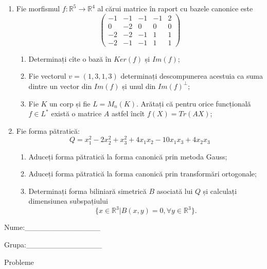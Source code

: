 \documentclass{article}
\begin{document}
\begin{enumerate}
 \item Fie morfismul $f:\mathbb{R}^5 \to \mathbb{R}^4$ al cărui matrice în raport cu bazele canonice este
$$\begin{pmatrix}
-1&-1&-1&-1&2\\
0&-2&0&0&0\\
-2&-2&-1&1&1\\
-2&-1&-1&1&1
\end{pmatrix}$$

\begin{enumerate}
\item Determinați cîte o bază în $Ker(f)$ și $Im(f)$;
\item Fie vectorul $v=(1,3,1,3)$ determinați descompunerea acestuia ca suma dintre un vector din $Im(f)$ și unul din $Im(f)^\perp$;
\item Fie $K$ un corp și fie $L=M_n(K)$. Arătați că pentru orice funcțională $f \in L^*$ există o matrice $A$ astfel încît $f(X)=Tr(AX)$;
\end{enumerate}
\item Fie forma pătratică:
$$Q= x_1^2-2x_2^2+x_3^2+4x_1x_2-10x_1x_3+4x_2x_3$$

\begin{enumerate}
\item Aduceți forma pătratică la forma canonică prin metoda Gauss;
\item Aduceți forma pătratică la forma canonică prin transformări ortogonale;
\item Determinați forma biliniară simetrică $B$ asociată lui $Q$ și calculați dimensiunea subspațiului
$$\{x \in \mathbb{R}^3 | B(x,y)=0,\forall y \in \mathbb{R}^3\}.$$

\end{enumerate}
\end{enumerate}
\newpage
\begin{flushright}
Nume:\_\_\_\_\_\_\_\_\_\_\_\_\_\_
 
 
Grupa:\_\_\_\_\_\_\_\_\_\_\_\_\_\_
\end{flushright}
\begin{center}
\vspace{2cm}
{\Large Probleme}
\vspace{2cm}
\end{center}
\end{document}
